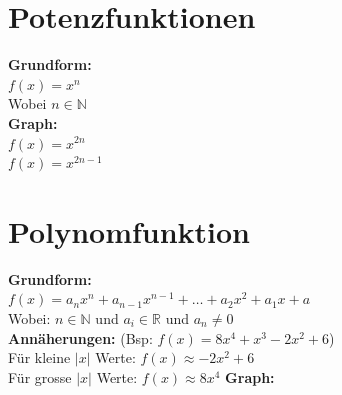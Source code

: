 \documentclass[11pt,twocolumn,a4paper]{article}
\title{\titleText}
\author{\authorText}
\date{\dateText}
\newcommand*{\field}[1]{\mathbb{#1}}%
\begin{document}
\section{Potenzfunktionen}
\textbf{Grundform:}\\
\(f(x) = x^n\)\\Wobei \(n \in \field{N}\)\\
\textbf{Graph:}\\
\(f(x) = x^{2n}\)\\
\(f(x) = x^{2n-1}\)
\section{Polynomfunktion}
\textbf{Grundform:}\\
\(f(x) = a_nx^n + a_{n-1}x^{n-1} + \dots + a_2x^2 + a_1x + a \)\\
Wobei: \(n \in \field{N}\) und \(a_i \in \field{R}\) und \(a_n \ne 0\)\\
\textbf{Annäherungen:} (Bsp: \(f(x)=8x^4+x^3-2x^2+6\))\\
Für kleine \(|x|\) Werte: \(f(x) \approx -2x^2 + 6\)\\
Für grosse \(|x|\) Werte: \(f(x) \approx 8x^4\)
\textbf{Graph:}\\
\end{document}

